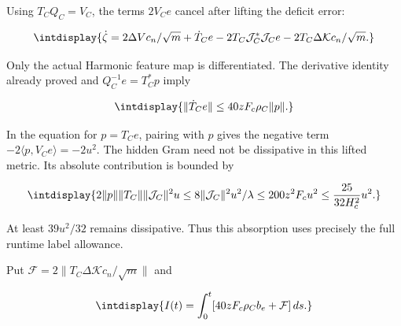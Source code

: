 Using \(T_CQ_C=V_C\), the terms \(2V_Ce\) cancel after lifting the deficit error:


\begingroup\renewcommand{\theHequation}{intdisplay.595}
\begin{equation}
\intdisplay{
\dot\zeta=2\Delta Vc_n/\sqrt m+\dot T_Ce
       -2T_C\mathcal J_C^*\mathcal J_Ce
       -2T_C\Delta\mathcal Kc_n/\sqrt m.
}
\label{int:eq-0252-harmonic-exact-readout-cancellation}
\end{equation}
\endgroup


Only the actual Harmonic feature map is differentiated. The derivative identity already proved and \(Q_C^{-1}e=T_C^*p\) imply


\begingroup\renewcommand{\theHequation}{intdisplay.596}
\begin{equation*}
\intdisplay{
\|\dot T_Ce\|\le40zF_c\rho_C\|p\|.
}
\end{equation*}
\endgroup


In the equation for \(p=T_Ce\), pairing with \(p\) gives the negative term \(-2\langle p,\allowbreak V_Ce\rangle=-2u^2\). The hidden Gram need not be dissipative in this lifted metric. Its absolute contribution is bounded by


\begingroup\renewcommand{\theHequation}{intdisplay.597}
\begin{equation}
\intdisplay{
2\|p\|\|T_C\|\|\mathcal J_C\|^2u
 \le8\|\mathcal J_C\|^2u^2/\lambda
 \le200z^2F_cu^2\le\frac{25}{32H_c^2}u^2.
}
\label{int:eq-0253-harmonic-hidden-gram-absorption}
\end{equation}
\endgroup


At least \(39u^2/32\) remains dissipative. Thus this absorption uses precisely the full runtime label allowance.



Put \(\mathcal F=2\|T_C\Delta\mathcal Kc_n/\sqrt m\|\) and


\begingroup\renewcommand{\theHequation}{intdisplay.598}
\begin{equation*}
\intdisplay{
I(t)=\int_0^t[40zF_c\rho_Cb_e+\mathcal F]\,ds.
}
\end{equation*}
\endgroup


